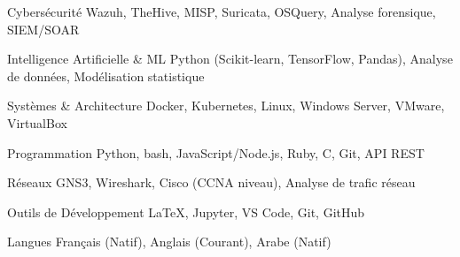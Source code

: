 
\begin{cvskills}

    \cvskill
    {Cybersécurité} %
    {Wazuh, TheHive, MISP, Suricata, OSQuery, Analyse forensique, SIEM/SOAR} %

    \cvskill
    {Intelligence Artificielle \& ML} %
    {Python (Scikit-learn, TensorFlow, Pandas), Analyse de données, Modélisation statistique} %

    \cvskill
    {Systèmes \& Architecture} %
    {Docker, Kubernetes, Linux, Windows Server, VMware, VirtualBox} %

    \cvskill
    {Programmation} %
    {Python, bash, JavaScript/Node.js, Ruby, C, Git, API REST} %

    \cvskill
    {Réseaux} %
    {GNS3, Wireshark, Cisco (CCNA niveau), Analyse de trafic réseau} %

    \cvskill
    {Outils de Développement} %
    {LaTeX, Jupyter, VS Code, Git, GitHub} %

    \cvskill
    {Langues} %
    {Français (Natif), Anglais (Courant), Arabe (Natif)} %

\end{cvskills}